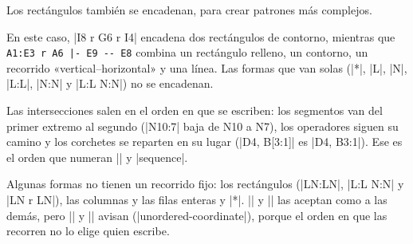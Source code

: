 \begin{codeexample}[width=6cm]
	\begin{goban}[label = {at = all}]
	\end{goban}
\end{codeexample}

Los rectángulos también se encadenan, para crear patrones más complejos.

\begin{codeexample}[width=6cm]
	\begin{goban}[label = {at = all}]
	\end{goban}
\end{codeexample}

En este caso, |I8 r G6 r I4| encadena dos rectángulos de contorno, mientras que \verb+A1:E3 r A6 |- E9 -- E8+ combina un rectángulo relleno, un contorno, un recorrido «vertical--horizontal» y una línea. Las formas que van solas (|*|, |L|, |N|, |L:L|, |N:N| y |L:L N:N|) no se encadenan.

\label{subsec:orden-coordenadas}

Las intersecciones salen en el orden en que se escriben: los segmentos van del primer extremo al segundo (|N10:7| baja de N10 a N7), los operadores siguen su camino y los corchetes se reparten en su lugar (|D4, B[3:1]| es |D4, B3:1|). Ese es el orden que numeran |\moves| y |sequence|.

\begin{codeexample}[width=6cm]
	\begin{goban}[7, label = {at = {south, west}}]
	\end{goban}

	\begin{goban}[7, label = {at = {south, west}}]
	\end{goban}
\end{codeexample}

Algunas formas no tienen un recorrido fijo: los rectángulos (|LN:LN|, |L:L N:N| y |LN r LN|), las columnas y las filas enteras y |*|. |\stones| y |\marks| las aceptan como a las demás, pero |\marks[sequence]| y |\moves| avisan (|unordered-coordinate|), porque el orden en que las recorren no lo elige quien escribe.

